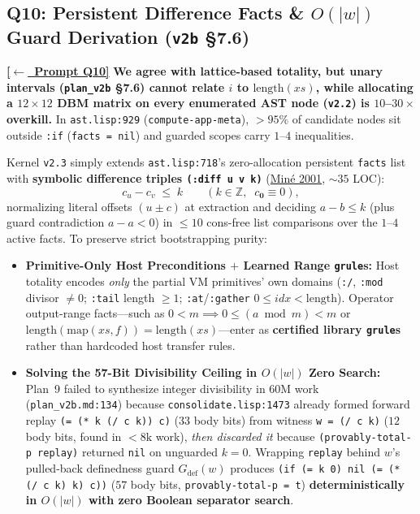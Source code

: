 \documentclass[12pt]{article}
\newcommand{\ansback}[2]{\hyperlink{#1}{\textcolor{qpurple}{\textbf{\small[\(\leftarrow\)~#2]}}}}
\newcommand{\litref}[2]{\hyperlink{lit:#1}{\textcolor{citegreen}{#2}}}
\begin{document}
\subsection{Q10: Persistent Difference Facts \& \texorpdfstring{$O(|w|)$}{O(|w|)} Guard Derivation (\texttt{v2b} \S7.6)}
\label{ans:10}

\ansback{q:10}{Prompt Q10}
\textbf{We agree with lattice-based totality, but unary intervals (\texttt{plan\_v2b} \S7.6) cannot relate $i$ to $\mathrm{length}(xs)$, while allocating a $12\times 12$ DBM matrix on every enumerated AST node (\texttt{v2.2}) is $10$--$30\times$ overkill.} In \texttt{ast.lisp:929} (\texttt{compute-app-meta}), $>95\%$ of candidate nodes sit outside \texttt{:if} (\texttt{facts = nil}) and guarded scopes carry $1$--$4$ inequalities.

Kernel \texttt{v2.3} simply extends \texttt{ast.lisp:718}'s zero-allocation persistent \texttt{facts} list with \textbf{symbolic difference triples \texttt{(:diff u v k)}} (\litref{mine2001}{Min\'e 2001}, $\sim 35$ LOC):
\begin{equation}\label{eq:dbm}
  c_u - c_v \;\le\; k \qquad (k \in \mathbb{Z},\;\; c_{\mathbf{0}} \equiv 0),
\end{equation}
normalizing literal offsets $(u \pm c)$ at extraction and deciding $a - b \le k$ (plus guard contradiction $a - a < 0$) in $\le 10$ cons-free list comparisons over the $1$--$4$ active facts. To preserve strict bootstrapping purity:
\begin{itemize}[leftmargin=1.6em, itemsep=0.15em]
  \item \textbf{Primitive-Only Host Preconditions $+$ Learned Range \texttt{grule}s:} Host totality encodes \emph{only} the partial VM primitives' own domains (\texttt{:/}, \texttt{:mod} divisor $\ne 0$; \texttt{:tail} length $\ge 1$; \texttt{:at}/\texttt{:gather} $0 \le idx < \mathrm{length}$). Operator output-range facts---such as $0 < m \implies 0 \le (a\bmod m) < m$ or $\mathrm{length}(\mathrm{map}(xs,f)) = \mathrm{length}(xs)$---enter as \textbf{certified library \texttt{grule}s} rather than hardcoded host transfer rules.
  \item \textbf{Solving the 57-Bit Divisibility Ceiling in $O(|w|)$ Zero Search:} Plan~9 failed to synthesize integer divisibility in $60\mathrm{M}$ work (\texttt{plan\_v2b.md:134}) because \texttt{consolidate.lisp:1473} already formed forward replay \texttt{(= (* k (/ c k)) c)} ($33$ body bits) from witness \texttt{w = (/ c k)} ($12$ body bits, found in $<8\mathrm{k}$ work), \emph{then discarded it} because \texttt{(provably-total-p replay)} returned \texttt{nil} on unguarded $k=0$. Wrapping \texttt{replay} behind $w$'s pulled-back definedness guard $G_{\mathrm{def}}(w)$ produces \texttt{(if (= k 0) nil (= (* (/ c k) k) c))} ($57$ body bits, \texttt{provably-total-p = t}) \textbf{deterministically in $O(|w|)$ with zero Boolean separator search}.
\end{itemize}
\end{document}
